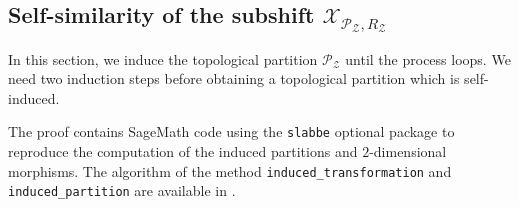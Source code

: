 \documentclass[12pt]{amsart}
\newcommand{\Z}{\mathbb{Z}}
\newcommand{\R}{\mathbb{R}}
\newcommand{\Pcal}{\mathcal{P}}
\newcommand{\Xcal}{\mathcal{X}} %
\newcommand{\Zcal}{\mathcal{Z}}
\newcommand{\Zrange}[1]{\llbracket0,#1\rrbracket}
\newcommand{\torus}{\mathbb{T}}
\newcommand{\sccode}{\textsc{Code}}
\begin{document}

\subsection{Self-similarity of the subshift $\Xcal_{\Pcal_\Zcal,R_\Zcal}$}
\label{sec:self-similarity-of-X-PZ-RZ}

In this section, we induce the topological partition
$\Pcal_\Zcal$ until the process loops.
We need two induction steps before obtaining a topological partition
which is self-induced.




The proof contains SageMath code 
using the \texttt{slabbe} optional package
\cite{labbe_slabbe_0_7_6_2023}
to reproduce the computation of the induced partitions and
$2$-dimensional morphisms. 
The algorithm of the method 
\texttt{induced\_transformation}
and
\texttt{induced\_partition} are available in 
\cite{MR4347332}.
\end{document}

